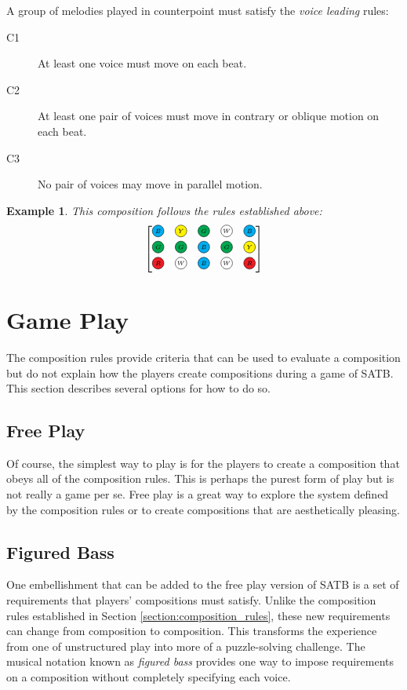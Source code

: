 \documentclass{scrartcl}
\newcommand{\RRR}{
  \begin{tikzpicture}
    \node[circle, draw, fill=Red, inner sep= 0pt, text width=1em, align=center] (n) at (0,0) {$\scriptscriptstyle R$};
  \end{tikzpicture}
}
\newcommand{\WWW}{
  \begin{tikzpicture}
    \node[circle, draw, fill=White,  inner sep= 0pt, text width=1em, align=center] (n) at (0,0) {$\scriptscriptstyle W$};
  \end{tikzpicture}
}
\newcommand{\BBB}{
  \begin{tikzpicture}
    \node[circle, draw, fill=Cyan,  inner sep= 0pt, text width=1em, align=center] (n) at (0,0) {$\scriptscriptstyle B$};
  \end{tikzpicture}
}
\newcommand{\GGG}{
  \begin{tikzpicture}
    \node[circle, draw, fill=Green,  inner sep= 0pt, text width=1em, align=center] (n) at (0,0) {$\scriptscriptstyle G$};
  \end{tikzpicture}
}
\newcommand{\YYY}{
  \begin{tikzpicture}
    \node[circle, draw, fill=Yellow,  inner sep= 0pt, text width=1em, align=center] (n) at (0,0) {$\scriptscriptstyle Y$};
  \end{tikzpicture}
}
\newtheorem{example}{Example}
\numberwithin{example}{section}
\begin{document}
A group of melodies played in counterpoint must satisfy the \emph{voice leading} rules:
\begin{description}
	\item[C1] At least one voice must move on each beat.
	\item[C2] At least one pair of voices must move in contrary or oblique motion on each beat.
	\item[C3] No pair of voices may move in parallel motion.
\end{description}

\begin{example}\label{example:valid_composition}
This composition follows the rules established above:
\begin{equation}\nonumber
\begin{bmatrix}
	\BBB & \YYY & \GGG & \WWW & \BBB \\
	\GGG & \GGG & \BBB & \GGG & \YYY \\
	\RRR & \WWW & \BBB & \WWW & \RRR
\end{bmatrix}
\end{equation}
\end{example}

\section{Game Play}
The composition rules provide criteria that can be used to evaluate a composition but do not
explain how the players create compositions during a game of SATB.  This section describes
several options for how to do so.

\subsection{Free Play}
Of course, the simplest way to play is for the players to create a composition that obeys all
of the composition rules.  This is perhaps the purest form of play but is not really a game
per se. Free play is a great way to explore the system defined by the composition rules
or to create compositions that are aesthetically pleasing.

\subsection{Figured Bass}
One embellishment that can be added to the free play version of SATB is a set of 
requirements that players' compositions must satisfy.  Unlike the composition rules
established in Section \ref{section:composition_rules}, these new requirements can change
from composition to composition.
This transforms the experience from one of unstructured play into more of a
puzzle-solving challenge.
The musical notation known as \emph{figured bass} provides one way to impose
requirements on a composition without completely specifying each voice.
\end{document}
